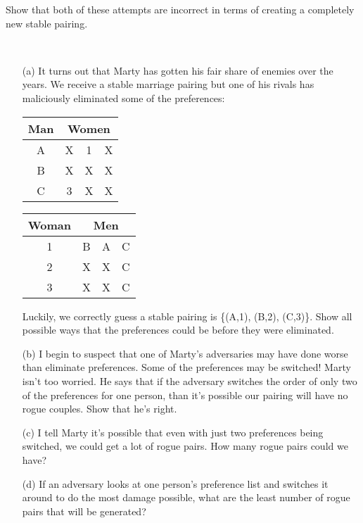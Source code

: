 \documentclass[11pt]{article}
\begin{document}
\begin{qunlist}
\begin{itemize}
 Show that both of these attempts are incorrect in terms of creating a completely new stable pairing.
\end{itemize} 
    



        
 \\
\begin{itemize}
\item[(a)] It turns out that Marty has gotten his fair share of enemies over the years. We receive a stable marriage pairing but one of his rivals has maliciously eliminated some of the preferences:

\begin{center}
\begin{tabular}{|c|ccc|}\hline 
Man&\multicolumn{3}{|c|}{Women}\\\hline 
A&X&1&X\\\hline 
B&X&X&X\\\hline 
C&3&X&X\\\hline
\end{tabular} 
\hspace{2cm}
\begin{tabular}{|c|ccc|}\hline 
Woman&\multicolumn{3}{|c|}{Men}\\\hline 
1&B&A&C\\\hline 
2&X&X&C\\\hline 
3&X&X&C\\\hline
\end{tabular}
\end{center}
        
        Luckily, we correctly guess a stable pairing is \{(A,1), (B,2), (C,3)\}. Show all possible ways that the preferences could be before they were eliminated.
        
\item[(b)] I begin to suspect that one of Marty's adversaries may have done worse than eliminate preferences. Some of the preferences may be switched! Marty isn't too worried. He says that if the adversary switches the order of only two of the preferences for one person, than it's possible our pairing will have no rogue couples. Show that he's right.
        
\item[(c)] I tell Marty it's possible that even with just two preferences being switched, we could get a lot of rogue pairs. How many rogue pairs could we have?
        
\item[(d)] If an adversary looks at one person's preference list and switches it around to do the most damage possible, what are the least number of rogue pairs that will be generated?


\end{itemize}
\end{qunlist}
\end{document}
